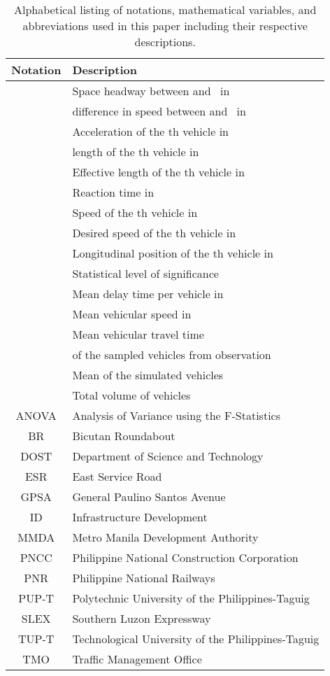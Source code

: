 \documentclass[preprint]{./acm_proc_article-sp}
\begin{document}
\begin{table*}[hbt]
\caption{Alphabetical listing of notations, mathematical variables, and abbreviations used in this paper including their respective descriptions.}\label{tab:notations}
\centering\begin{tabular}{cl}
\hline\hline
Notation & Description\\
\hline
 & Space headway between  and~ in~\\
 & difference in speed between  and~ in~\\
 & Acceleration of the th vehicle in~\\
 & length of the th vehicle in~\\
 & Effective length of the th vehicle in~\\
   & Reaction time in~\\
 & Speed of the th vehicle in~\\
 & Desired speed of the th vehicle in~\\
 & Longitudinal position of the th vehicle in~\\
\hline
 & Statistical level of significance\\
 & Mean delay time per vehicle in~\\
 & Mean vehicular speed in~\\
   & Mean vehicular travel time~\\
 &  of the sampled vehicles from observation\\
 & Mean  of the simulated vehicles\\
 & Total volume of vehicles\\
\hline
ANOVA    & Analysis of Variance using the F-Statistics\\
BR      & Bicutan Roundabout\\
DOST    & Department of Science and Technology\\
ESR     & East Service Road\\
GPSA    & General Paulino Santos Avenue\\
ID      & Infrastructure Development\\
MMDA    & Metro Manila Development Authority\\
PNCC    & Philippine National Construction Corporation\\
PNR     & Philippine National Railways\\
PUP-T   & Polytechnic University of the Philippines-Taguig\\
SLEX    & Southern Luzon Expressway\\
TUP-T   & Technological University of the Philippines-Taguig\\
TMO     & Traffic Management Office\\
\hline\hline
\end{tabular}
\end{table*}
\end{document}
